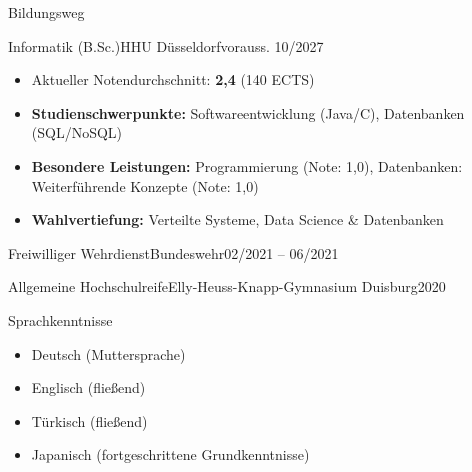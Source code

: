 \documentclass[]{mcdowellcv}
\begin{document}
    \begin{cvsection}{Bildungsweg}
        \begin{cvsubsection}{Informatik (B.Sc.)}{HHU Düsseldorf}{vorauss. 10/2027}
            \begin{itemize}
                \item Aktueller Notendurchschnitt: \textbf{2,4} (140 ECTS)
                \item \textbf{Studienschwerpunkte:} Softwareentwicklung (Java/C), Datenbanken (SQL/NoSQL)
                \item \textbf{Besondere Leistungen:} Programmierung (Note: 1,0), Datenbanken: Weiterführende Konzepte (Note: 1,0)
                \item \textbf{Wahlvertiefung:} Verteilte Systeme, Data Science \& Datenbanken 
            \end{itemize}
        \end{cvsubsection}
        
        \vspace{0.15cm}
        
        \begin{cvsubsection}{Freiwilliger Wehrdienst}{Bundeswehr}{02/2021 -- 06/2021}
        \end{cvsubsection}
        
        \vspace{0.15cm}
        
        \begin{cvsubsection}{Allgemeine Hochschulreife}{Elly-Heuss-Knapp-Gymnasium Duisburg}{2020}
        \end{cvsubsection}
    \end{cvsection}

    \vspace{0.25cm}

    \begin{cvsection}{Sprachkenntnisse}
        \begin{cvsubsection}{}{}{}     
            \begin{itemize}
                \item Deutsch (Muttersprache)
                \item Englisch (fließend)
                \item Türkisch (fließend)
                \item Japanisch (fortgeschrittene Grundkenntnisse)
            \end{itemize}
        \end{cvsubsection}
    \end{cvsection}
    
\end{document}

